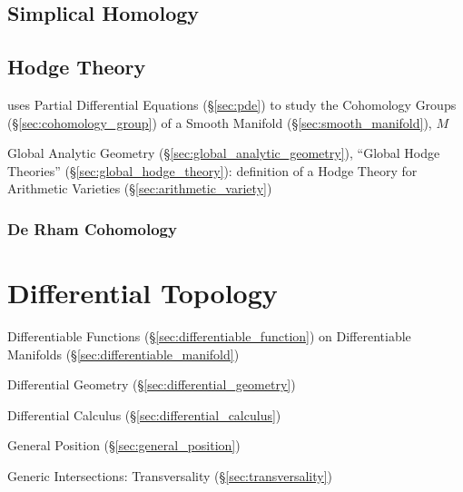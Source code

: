 \subsection{Simplical Homology}\label{sec:simplical_homology}

\subsection{Hodge Theory}\label{sec:hodge_theory}

uses Partial Differential Equations (\S\ref{sec:pde}) to study the Cohomology
Groups (\S\ref{sec:cohomology_group}) of a Smooth Manifold
(\S\ref{sec:smooth_manifold}), $M$

\fist Global Analytic Geometry (\S\ref{sec:global_analytic_geometry}), ``Global
Hodge Theories'' (\S\ref{sec:global_hodge_theory}): definition of a Hodge
Theory for Arithmetic Varieties (\S\ref{sec:arithmetic_variety})



\subsubsection{De Rham Cohomology}\label{sec:derham_cohomology}



\section{Differential Topology}\label{sec:differential_topology}

Differentiable Functions (\S\ref{sec:differentiable_function}) on Differentiable
Manifolds (\S\ref{sec:differentiable_manifold})

\fist Differential Geometry (\S\ref{sec:differential_geometry})

\fist Differential Calculus (\S\ref{sec:differential_calculus})

General Position (\S\ref{sec:general_position})

Generic Intersections: Transversality (\S\ref{sec:transversality})




